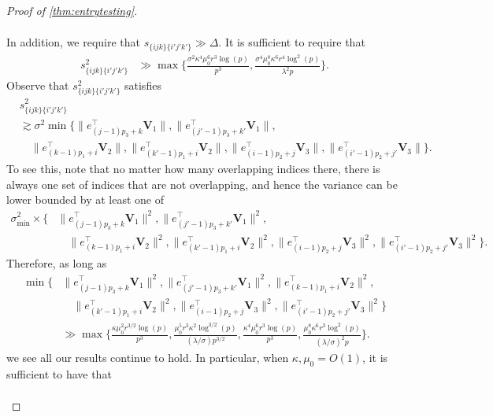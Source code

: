 \documentclass[10pt]{article}
\newcommand{\0}{{\mathbf{0}}}
\newcommand{\1}{{\mathbf{1}}}
\renewcommand{\t}{^{\top}}
\begin{document}
\begin{proof}[Proof of \cref{thm:entrytesting}]
\begin{itemize}
\begin{align*}
\end{align*}
In addition, we require that  $s_{\{ijk\}\{i'j'k'\}}\gg \Delta$.  It is sufficient to require that
\begin{align*}
    s^2_{\{ijk\}\{i'j'k'\}} &\gg \max\bigg\{ \frac{\sigma^2 \kappa^4 \mu_0^6 r^3 \log(p)}{p^3}, \frac{\sigma^4 \mu_0^8 \kappa^6 r^4 \log^2(p)}{\lambda^2 p} \bigg\}.
\end{align*}
Observe that $s^2_{\{ijk\}\{i'j'k'\}}$ satisfies
\begin{align*}
    &s^2_{\{ijk\}\{i'j'k'\}} \\
    &\gtrsim \sigma^2 \min\bigg\{ \| e_{(j-1)p_3 + k }\t \mathbf{V}_1\|, \| e_{(j'-1)p_3 + k'}\t \mathbf{V}_1\|,\\
    &\quad \| e_{(k-1)p_1 + i}\t \mathbf{V}_2 \|, \| e_{(k'-1)p_1 + i}\t \mathbf{V}_2 \|, \| e_{(i-1)p_2 + j}\t \mathbf{V}_3 \|, \| e_{(i'-1)p_2 + j'}\t \mathbf{V}_3 \| \bigg\}.
\end{align*}
To see this, note that no matter how many overlapping indices there, there is always one set of indices that are not overlapping, and hence the variance can be lower bounded by at least one of
\begin{align*}
 \sigma_{\min}^2 \times   \bigg\{ &\| e_{(j-1)p_3 + k }\t \mathbf{V}_1\|^2, \| e_{(j'-1)p_3 + k'}\t \mathbf{V}_1\|^2,\\
 &\quad \| e_{(k-1)p_1 + i}\t \mathbf{V}_2 \|^2, \| e_{(k'-1)p_1 + i}\t \mathbf{V}_2 \|^2, \| e_{(i-1)p_2 + j}\t \mathbf{V}_3 \|^2, \| e_{(i'-1)p_2 + j'}\t \mathbf{V}_3 \|^2 \bigg\}.
\end{align*}
Therefore, as long as 
\begin{align*}
    \min\bigg\{ &\| e_{(j-1)p_3 + k }\t \mathbf{V}_1\|^2, \|e_{(j'-1)p_3 + k'}\t \mathbf{V}_1\|^2, \| e_{(k-1)p_1 + i}\t \mathbf{V}_2 \|^2, \\
    &\quad \| e_{(k'-1)p_1 + i}\t \mathbf{V}_2 \|^2, \| e_{(i-1)p_2 + j}\t \mathbf{V}_3 \|^2, \| e_{(i'-1)p_2 + j'}\t \mathbf{V}_3 \|^2 \bigg\} \\
    &\gg \max\bigg\{ \frac{\kappa \mu_0^2 r^{3/2} \log(p)}{p^3} , \frac{\mu_0^5 r^3 \kappa^2 \log^{3/2}(p)}{(\lambda/\sigma)p^{3/2}}, \frac{\kappa^4 \mu_0^6 r^3 \log(p)}{p^3}, \frac{\mu_0^8 \kappa^6 r^3 \log^2(p)}{(\lambda/\sigma)^2 p} \bigg\}.
    \end{align*}
    we see all our results continue to hold. In particular, when $\kappa,\mu_0 = O(1)$, it is sufficient to have that
    \begin{align*}

\end{align*}
\end{itemize}
\end{proof}
\end{document}
